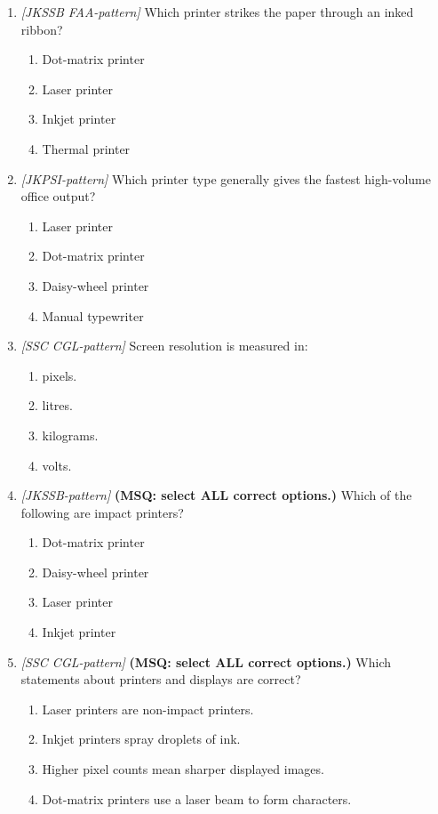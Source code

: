 \documentclass[11pt]{article}
\begin{document}
\begin{enumerate}[label=\textbf{Q\arabic*.}, leftmargin=*]
\item \textit{[JKSSB FAA-pattern]} Which printer strikes the paper through an inked ribbon?
  \begin{enumerate}[label=\Alph*.]
    \item Dot-matrix printer
    \item Laser printer
    \item Inkjet printer
    \item Thermal printer
  \end{enumerate}
\item \textit{[JKPSI-pattern]} Which printer type generally gives the fastest high-volume office output?
  \begin{enumerate}[label=\Alph*.]
    \item Laser printer
    \item Dot-matrix printer
    \item Daisy-wheel printer
    \item Manual typewriter
  \end{enumerate}
\item \textit{[SSC CGL-pattern]} Screen resolution is measured in:
  \begin{enumerate}[label=\Alph*.]
    \item pixels.
    \item litres.
    \item kilograms.
    \item volts.
  \end{enumerate}
\item \textit{[JKSSB-pattern]} \textbf{(MSQ: select ALL correct options.)} Which of the following are impact printers?
  \begin{enumerate}[label=\Alph*.]
    \item Dot-matrix printer
    \item Daisy-wheel printer
    \item Laser printer
    \item Inkjet printer
  \end{enumerate}
\item \textit{[SSC CGL-pattern]} \textbf{(MSQ: select ALL correct options.)} Which statements about printers and displays are correct?
  \begin{enumerate}[label=\Alph*.]
    \item Laser printers are non-impact printers.
    \item Inkjet printers spray droplets of ink.
    \item Higher pixel counts mean sharper displayed images.
    \item Dot-matrix printers use a laser beam to form characters.
  \end{enumerate}
\end{enumerate}
\def\JKSSBLessonID{15}\def\JKSSBAnswers{0}
\end{document}
